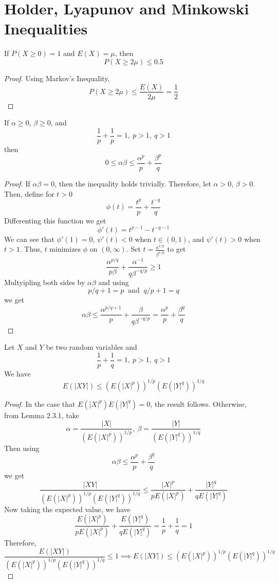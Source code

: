 \documentclass[openany]{report}
\begin{document}
\section{Holder, Lyapunov and Minkowski Inequalities}
\begin{corollary}
    If $P(X \geq 0) = 1$ and $E(X) = \mu$, then 
    \[P(X \geq 2\mu) \leq 0.5\]
\end{corollary}
\begin{proof}
    Using Markov's Inequality, 
    \[P(X \geq 2\mu) \leq \frac{E(X)}{2\mu} = \frac{1}{2}\]
\end{proof}
\begin{lemma}
    If $\alpha \geq 0$, $\beta \geq 0$, and
    \[\frac{1}{p} + \frac{1}{p} = 1, \ p>1, \ q > 1\]
    then 
    \[0 \leq \alpha \beta \leq \frac{\alpha^p}{p} + \frac{\beta^p}{q}\]
\end{lemma}
\begin{proof}
    If $\alpha\beta=0$, then the inequality holds trivially. Therefore, let $\alpha > 0$, $\beta > 0$. Then, define for $t > 0$
    \[\phi(t) = \frac{t^p}{p} + \frac{t^{-q}}{q}\]
    Differenting this function we get 
    \[\phi'(t) = t^{p-1} - t^{-q-1}\]
    We can see that $\phi'(1) = 0$, $\psi'(t) < 0$ when $t \in (0,1)$, and $\psi'(t) > 0$ when $t > 1$. Thus, $t$ minimizes $\phi$ on $(0,\infty)$. Set $t = \frac{a^{1/q}}{\beta^{1/p}}$ to get 
    \[\frac{\alpha^{p/q}}{p\beta} + \frac{\alpha^{-1}}{q\beta^{-q/p}} \geq 1\]
    Multyipling both sides by $\alpha\beta$ and using 
    \[p/q + 1 = p \ \text{ and } \ q/p + 1 = q\]
    we get
    \[\alpha\beta \leq \frac{\alpha^{p/q+1}}{p} + \frac{\beta}{q\beta^{-q/p}} = \frac{\alpha^p}{p} + \frac{\beta^q}{q}\]
\end{proof}
\begin{theorem}
    Let $X$ and $Y$ be two random variables and 
    \[\frac{1}{p} + \frac{1}{q} = 1, \ p > 1, \ q > 1\]
    We have 
    \[E(|XY|) \leq (E(|X|^p))^{1/p}(E(|Y|^q))^{1/q}\]
\end{theorem}
\begin{proof}
    In the case that $E(|X|^p)E(|Y|^q) = 0$, the result follows. Otherwise, from Lemma 2.3.1, take 
    \[\alpha = \frac{|X|}{(E(|X|^p))^{1/p}}, \ \beta = \frac{|Y|}{(E(|Y|^q))^{1/q}}\]
    Then using 
    \[\alpha\beta \leq \frac{\alpha^p}{p} + \frac{\beta^q}{q}\]
    we get
    \[\frac{|XY|}{(E(|X|^p))^{1/p}(E(|Y|^q))^{1/q}} \leq \frac{|X|^p}{pE(|X|^p)} + \frac{|Y|^q}{qE(|Y|^q)}\]
    Now taking the expected value, we have
    \[\frac{E(|X|^p)}{pE(|X|^p)} + \frac{E(|Y|^q)}{qE(|Y|^q)} = \frac{1}{p} + \frac{1}{q} = 1\]
    Therefore,
    \[\frac{E(|XY|)}{(E(|X|^p))^{1/p}(E(|Y|^q))^{1/q}} \leq 1 \implies E(|XY|) \leq (E(|X|^p))^{1/p}(E(|Y|^q))^{1/q}\]
\end{proof}
\end{document}
